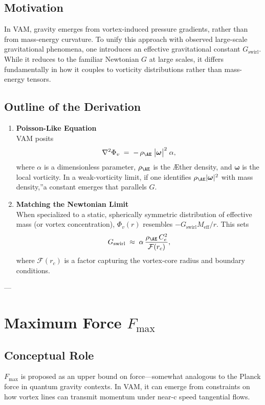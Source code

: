 \subsection{Motivation}
In VAM, gravity emerges from vortex-induced pressure gradients, rather than from mass-energy curvature. To unify this approach with observed large-scale gravitational phenomena, one introduces an effective gravitational constant \(G_\text{swirl}\). While it reduces to the familiar Newtonian \(G\) at large scales, it differs fundamentally in how it couples to vorticity distributions rather than mass-energy tensors.

\subsection{Outline of the Derivation}
\begin{enumerate}
    \item \textbf{Poisson-Like Equation} \\
    VAM posits
    \[
        \nabla^2 \Phi_v
        \;=\;
        -\,\rho_{\mathrm{\AE}}\;\bigl|\boldsymbol{\omega}\bigr|^2 \; \alpha,
    \]
    where \(\alpha\) is a dimensionless parameter, \(\rho_{\mathrm{\AE}}\) is the Æther density, and \(\boldsymbol{\omega}\) is the local vorticity. In a weak-vorticity limit, if one identifies \(\rho_{\mathrm{\AE}} |\boldsymbol{\omega}|^2\) with \grqq mass density,\textquotedblright a constant emerges that parallels \(G\).

    \item \textbf{Matching the Newtonian Limit} \\
    When specialized to a static, spherically symmetric distribution of effective mass (or vortex concentration), \(\Phi_v(r)\) resembles \(-G_\text{swirl} M_\text{eff}/r\). This sets
    \[
        G_\text{swirl}
        \;\approx\;
        \alpha \,\frac{\rho_{\mathrm{\AE}}\,C_e^2}{\mathcal{F}(r_c)},
    \]
    where \(\mathcal{F}(r_c)\) is a factor capturing the vortex-core radius and boundary conditions.
\end{enumerate}

---

\section{Maximum Force \(F_{\max}\)}

\subsection{Conceptual Role}
\(F_{\max}\) is proposed as an upper bound on force—somewhat analogous to the Planck force in quantum gravity contexts. In VAM, it can emerge from constraints on how vortex lines can transmit momentum under near-c speed tangential flows.

